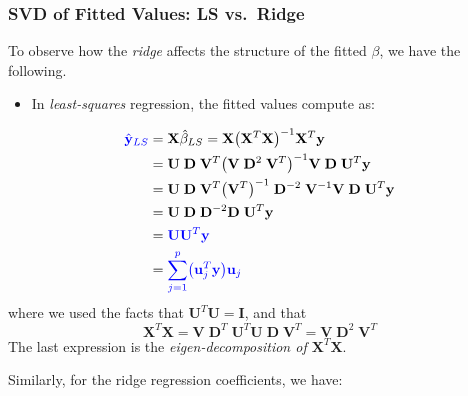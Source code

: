 \documentclass[
]{book}
\providecommand{\tightlist}{%
  \setlength{\itemsep}{0pt}\setlength{\parskip}{0pt}}
\begin{document}
\subsubsection*{SVD of Fitted Values: LS vs.~Ridge}\label{svd-of-fitted-values-ls-vs.-ridge}

To observe how the \emph{ridge} affects the structure of the fitted \(\beta\), we have the following.

\begin{itemize}
\tightlist
\item
  In \emph{least-squares} regression, the fitted values compute as:
\end{itemize}

\begin{align*}
{\color{blue}{\hat{\mathbf{y}}_{LS}}} &= \mathbf{X} \hat{\beta}_{LS}= \mathbf{X} \bigl(\mathbf{X}^T \mathbf{X} \bigr)^{-1} \mathbf{X}^T \mathbf{y}\\
&= \mathbf{U} \; \mathbf{D}\; \mathbf{V}^T \bigl(\mathbf{V}\; \mathbf{D}^2\; \mathbf{V}^T\bigr)^{-1} \mathbf{V}\; \mathbf{D}\;\mathbf{U}^T \mathbf{y}\\
&= \mathbf{U} \; \mathbf{D}\; \mathbf{V}^T \bigl( \mathbf{V}^T \bigl)^{-1}\; \mathbf{D}^{-2}\; \mathbf{V}^{-1} \mathbf{V}\; \mathbf{D}\;\mathbf{U}^T \mathbf{y}\\
&= \mathbf{U} \; \mathbf{D}\; \mathbf{D}^{-2}\mathbf{D}\;\mathbf{U}^T \mathbf{y}\\
&= {\color{blue}{\mathbf{U} \mathbf{U}^T \mathbf{y}}}\\
&= {\color{blue}{\sum_{j=1}^{p} \bigl(\mathbf{u}_j^T \mathbf{y} \bigr) \mathbf{u}_{j}}}
\end{align*}
where we used the facts that \(\mathbf{U}^T \mathbf{U} =\mathbf{I}\), and that
\[\mathbf{X}^T \mathbf{X} = \mathbf{V}\; \mathbf{D}^T\;\mathbf{U}^T \mathbf{U} \; \mathbf{D}\; \mathbf{V}^T = \mathbf{V}\; \mathbf{D}^2\; \mathbf{V}^T\]
The last expression is the \emph{eigen-decomposition of \(\mathbf{X}^T \mathbf{X}\)}.

Similarly, for the ridge regression coefficients, we have:
\end{document}
